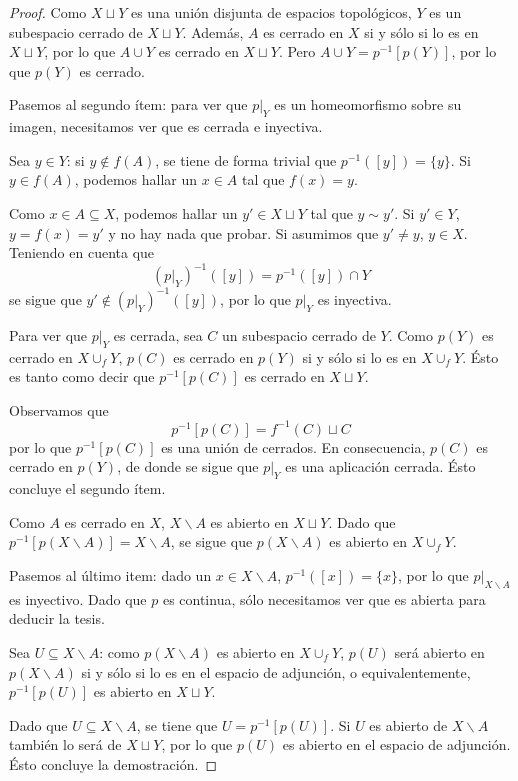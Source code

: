 \begin{proof}
Como $X\sqcup Y$ es una unión disjunta de espacios topológicos, $Y$ es un
subespacio cerrado de $X\sqcup Y$. Además, $A$ es cerrado en $X$ si y sólo si
lo es en $X \sqcup Y$, por lo que $A\cup Y$ es cerrado en $X \sqcup Y$. Pero
$A\cup Y=p^{-1}[p(Y)]$, por lo que $p(Y)$ es cerrado.

Pasemos al segundo ítem: para ver que $p|_Y$ es un homeomorfismo sobre su
imagen, necesitamos ver que es cerrada e inyectiva.

Sea $y\in Y$: si $y \not\in f(A)$, se tiene de forma trivial que $p^{-1}([y])=
\{y\}$. Si $y \in f(A)$, podemos hallar un $x \in A$ tal que $f(x)=y$.

Como $x \in A \subseteq X$, podemos hallar un $y' \in X\sqcup Y$ tal que $y
\sim y'$. Si $y' \in Y$, $y=f(x)=y'$ y no hay nada que probar. Si asumimos que
$y'\neq y$, $y \in X$. Teniendo en cuenta que 
\[(p|_Y)^{-1}([y])=p^{-1}([y])\cap Y\]
se sigue que $y' \not \in (p|_Y)^{-1}([y])$, por lo que $p|_Y$ es inyectiva.

Para ver que $p|_Y$ es cerrada, sea $C$ un subespacio cerrado de $Y$. Como
$p(Y)$ es cerrado en $X \cup_f Y$, $p(C)$ es cerrado en $p(Y)$ si y sólo si lo
es en $X \cup_f Y$. Ésto es tanto como decir que $p^{-1}[p(C)]$ es cerrado en
$X \sqcup Y$.

Observamos que
\[p^{-1}[p(C)]=f^{-1}(C)\sqcup C\]
por lo que $p^{-1}[p(C)]$ es una unión de cerrados. En consecuencia, $p(C)$ es
cerrado en $p(Y)$, de donde se sigue que $p|_Y$ es una aplicación cerrada.
Ésto concluye el segundo ítem.

Como $A$ es cerrado en $X$, $X\backslash A$ es abierto en $X \sqcup Y$. Dado
que\\ $p^{-1}[p(X\backslash A)]=X\backslash A$, se sigue que
$p(X\backslash A)$ es abierto en $X\cup_f Y$.

Pasemos al último item: dado un $x \in X\backslash A$, $p^{-1}([x])=\{x\}$,
por lo que $p|_{X\backslash A}$ es inyectivo. Dado que $p$ es continua, sólo
necesitamos ver que es abierta para deducir la tesis.

Sea $U\subseteq X\backslash A$: como $p(X\backslash A)$ es abierto en
$X\cup_f Y$, $p(U)$ será abierto en $p(X\backslash A)$ si y sólo si lo es en
el espacio de adjunción, o equivalentemente, $p^{-1}[p(U)]$ es abierto en
$X\sqcup Y$.

Dado que $U\subseteq X\backslash A$, se tiene que $U=p^{-1}[p(U)]$. Si $U$
es abierto de $X\backslash A$ también lo será de $X\sqcup Y$, por lo que
$p(U)$ es abierto en el espacio de adjunción. Ésto concluye la demostración.
\end{proof}

